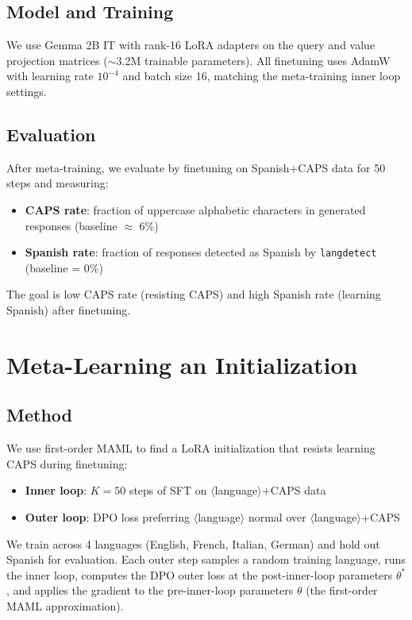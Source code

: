 \documentclass{article}
\begin{document}
\subsection{Model and Training}

We use Gemma 2B IT \citep{team2024gemma} with rank-16 LoRA adapters on the query and value projection matrices ($\sim$3.2M trainable parameters). All finetuning uses AdamW with learning rate $10^{-4}$ and batch size 16, matching the meta-training inner loop settings.

\subsection{Evaluation}

After meta-training, we evaluate by finetuning on Spanish+CAPS data for 50 steps and measuring:
\begin{itemize}
    \item \textbf{CAPS rate}: fraction of uppercase alphabetic characters in generated responses (baseline $\approx$ 6\%)
    \item \textbf{Spanish rate}: fraction of responses detected as Spanish by \texttt{langdetect} (baseline = 0\%)
\end{itemize}

The goal is low CAPS rate (resisting CAPS) and high Spanish rate (learning Spanish) after finetuning.

\section{Meta-Learning an Initialization}
\label{sec:init}

\subsection{Method}

We use first-order MAML \citep{finn2017model} to find a LoRA initialization that resists learning CAPS during finetuning:
\begin{itemize}
    \item \textbf{Inner loop}: $K=50$ steps of SFT on $\langle$language$\rangle$+CAPS data
    \item \textbf{Outer loop}: DPO loss preferring $\langle$language$\rangle$ normal over $\langle$language$\rangle$+CAPS
\end{itemize}

We train across 4 languages (English, French, Italian, German) and hold out Spanish for evaluation. Each outer step samples a random training language, runs the inner loop, computes the DPO outer loss at the post-inner-loop parameters $\theta^*$, and applies the gradient to the pre-inner-loop parameters $\theta$ (the first-order MAML approximation).
\end{document}
